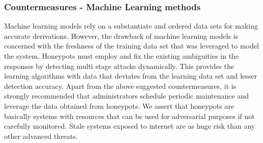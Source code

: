 \documentclass[../main.tex]{subfiles}
\begin{document}
\subsubsection{Countermeasures - Machine Learning methods}
Machine learning models rely on a substantiate and ordered data sets for making accurate derivations. However, the drawback of machine learning models is concerned with the freshness of the training data set that was leveraged to model the system. Honeypots must employ and fix the existing ambiguities in the responses by detecting multi stage attacks dynamically. This provides the learning algorithms with data that deviates from the learning data set and lesser detection accuracy.
\newline
Apart from the above suggested countermeasures, it is strongly recommended that administrators schedule periodic maintenance and leverage the data obtained from honeypots. We assert that honeypots are basically systems with resources that can be used for adversarial purposes if not carefully monitored. Stale systems exposed to internet are as huge risk than any other advanced threats. 
\end{document}

